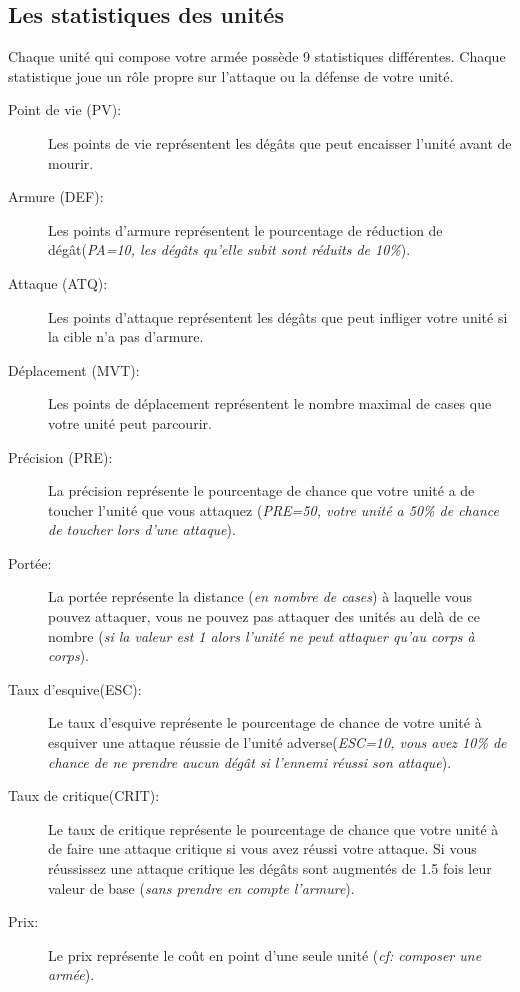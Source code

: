 \documentclass[a4paper]{article}
\begin{document}
	\subsection{Les statistiques des unités}
	
	\quad Chaque unité qui compose votre armée possède 9 statistiques différentes. Chaque statistique joue un rôle propre sur l'attaque ou la défense de votre unité.
	
	\begin{description}
	
		\item[Point de vie (PV): ]Les points de vie représentent les dégâts que peut encaisser l'unité avant de mourir.
		\item[Armure (DEF): ]Les points d'armure représentent le pourcentage de réduction de dégât(\textit{PA=10, les dégâts qu'elle subit sont réduits de 10\%}).
		\item[Attaque (ATQ): ]Les points d'attaque représentent les dégâts que peut infliger votre unité si la cible n'a pas d'armure.
		\item[Déplacement (MVT): ]Les points de déplacement représentent le nombre maximal de cases que votre unité peut parcourir.
		\item[Précision (PRE): ]La précision représente le pourcentage de chance que votre unité a de toucher l'unité que vous attaquez (\textit{PRE=50, votre unité a 50\% de chance de toucher lors d'une attaque}).
		\item[Portée: ]La portée représente la distance (\textit{en nombre de cases}) à laquelle vous pouvez attaquer, vous ne pouvez pas attaquer des unités au delà de ce nombre (\textit{si la valeur est 1 alors l'unité ne peut attaquer qu'au corps à corps}).
		\item[Taux d'esquive(ESC): ]Le taux d'esquive représente le pourcentage de chance de votre unité à esquiver une attaque réussie de l'unité adverse(\textit{ESC=10, vous avez 10\% de chance de ne prendre aucun dégât si l'ennemi réussi son attaque}).
		\item[Taux de critique(CRIT): ]Le taux de critique représente le pourcentage de chance que votre unité à de faire une attaque critique si vous avez réussi votre attaque. Si vous réussissez une attaque critique les dégâts sont augmentés de 1.5 fois leur valeur de base (\textit{sans prendre en compte l'armure}).
		\item[Prix: ]Le prix représente le coût en point d'une seule unité (\textit{cf: composer une armée}).
		
	\end{description}
\end{document}
